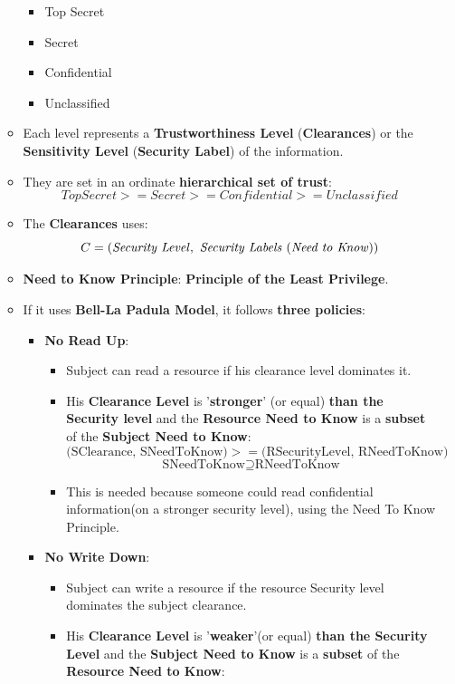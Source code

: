 \documentclass[9pt, letterpaper]{article}
\begin{document}
\begin{itemize}
\begin{itemize}
		\begin{itemize}
			\item Top Secret
			\item Secret
			\item Confidential
			\item Unclassified
		\end{itemize}
		\item Each level represents a \textbf{Trustworthiness Level} (\textbf{Clearances}) or the \textbf{Sensitivity Level} (\textbf{Security Label}) of the information.
		\item They are set in an ordinate \textbf{hierarchical set of trust}: $$ Top Secret >= Secret >= Confidential >= Unclassified $$
		\item The \textbf{Clearances} uses: $$C = ( \mbox{\textit{Security Level}}, \mbox{ \textit{Security Labels} (\textit{Need to Know})})$$
		\item \textbf{Need to Know Principle}: \textbf{Principle of the Least Privilege}.
		\item If it uses \textbf{Bell-La Padula Model}, it follows \textbf{three policies}:
		\begin{itemize}
			\item \textbf{No Read Up}: 
			\begin{itemize}
				\item Subject can read a resource if his clearance level dominates it.
				\item His \textbf{Clearance Level} is '\textbf{stronger}' (or equal) \textbf{than the Security level} and the \textbf{Resource Need to Know} is a \textbf{subset} of the \textbf{Subject Need to Know}:
				$$(\mbox{SClearance, SNeedToKnow)}>=(\mbox{RSecurityLevel, RNeedToKnow)}$$ 
				$$\mbox{SNeedToKnow} \supseteq \mbox{RNeedToKnow}$$
				\item This is needed because someone could read confidential information(on a stronger security level), using the Need To Know Principle.
			\end{itemize}		
			\newpage	 
			\item \textbf{No Write Down}: 
			\begin{itemize}
				\item Subject can write a resource if the resource Security level dominates the subject clearance.
				\item His \textbf{Clearance Level} is '\textbf{weaker}'(or equal) \textbf{than the Security Level} and the \textbf{Subject Need to Know} is a \textbf{subset} of the \textbf{Resource Need to Know}:

\end{itemize}
\end{itemize}
\end{itemize}
\end{itemize}
\end{document}
